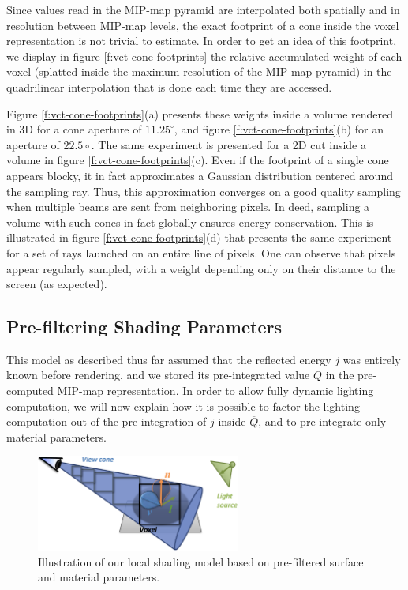 Since values read in the MIP-map pyramid are interpolated both spatially and in resolution between MIP-map levels, the exact footprint of a cone inside the voxel representation is not trivial to estimate. In order to get an idea of this footprint, we display in figure \ref{f:vct-cone-footprints} the relative accumulated weight of each voxel (splatted inside the maximum resolution of the MIP-map pyramid) in the quadrilinear interpolation that is done each time they are accessed.

Figure \ref{f:vct-cone-footprints}(a) presents these weights inside a volume rendered in 3D for a cone aperture of $11.25^{\circ}$, and figure \ref{f:vct-cone-footprints}(b) for an aperture of $22.5\circ$. The same experiment is presented for a 2D cut inside a volume in figure \ref{f:vct-cone-footprints}(c). Even if the footprint of a single cone appears blocky, it in fact approximates a Gaussian distribution centered around the sampling ray. Thus, this approximation converges on a good quality sampling when multiple beams are sent from neighboring pixels. In deed, sampling a volume with such cones in fact globally ensures energy-conservation. This is illustrated in figure \ref{f:vct-cone-footprints}(d) that presents the same experiment for a set of rays launched on an entire line of pixels. One can observe that pixels appear regularly sampled, with a weight depending only on their distance to the screen (as expected).




\subsection{Pre-filtering Shading Parameters}
This model as described thus far assumed that the reflected energy $j$ was entirely known before rendering, and we stored its pre-integrated value $\overline{Q}$ in the pre-computed MIP-map representation. In order to allow fully dynamic lighting computation, we will now explain how it is possible to factor the lighting computation out of the pre-integration of $j$ inside $\overline{Q}$, and to pre-integrate only material parameters.

\begin{figure}\label{f:vct-local-shading-model}
	\begin{center}
		\includegraphics[width=0.6\textwidth]{graphics/vct/vct-9-1}
	\end{center}
	\caption{Illustration of our local shading model based on pre-filtered surface and material parameters.}
\end{figure}


